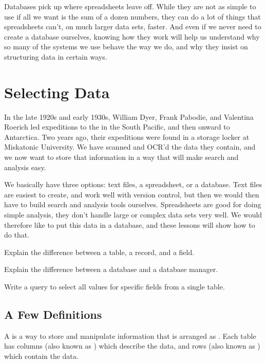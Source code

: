 \documentclass{book}
\begin{document}
Databases pick up where spreadsheets leave off. While they are not as
simple to use if all we want is the sum of a dozen numbers, they can do
a lot of things that spreadsheets can't, on much larger data sets,
faster. And even if we never need to create a database ourselves,
knowing how they work will help us understand why so many of the systems
we use behave the way we do, and why they insist on structuring data in
certain ways.

\section{Selecting Data}

In the late 1920s and early 1930s, William Dyer, Frank Pabodie, and
Valentina Roerich led expeditions to the
 in the South Pacific, and then onward to Antarctica.
Two years ago, their expeditions were found in a storage locker at
Miskatonic University. We have scanned and OCR'd the data they contain,
and we now want to store that information in a way that will make search
and analysis easy.

We basically have three options: text files, a spreadsheet, or a
database. Text files are easiest to create, and work well with version
control, but then we would then have to build search and analysis tools
ourselves. Spreadsheets are good for doing simple analysis, they don't
handle large or complex data sets very well. We would therefore like to
put this data in a database, and these lessons will show how to do that.

\begin{objectives}
\begin{swcitemize}
\item
  Explain the difference between a table, a record, and a field.
\item
  Explain the difference between a database and a database manager.
\item
  Write a query to select all values for specific fields from a single
  table.
\end{swcitemize}
\end{objectives}

\subsection{A Few Definitions}

A  is a way to
store and manipulate information that is arranged as
. Each table has columns (also known
as ) which describe the data, and
rows (also known as ) which contain
the data.
\end{document}

